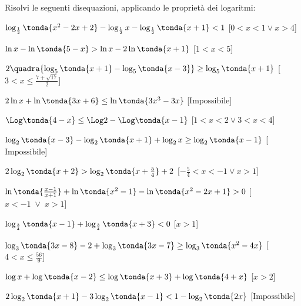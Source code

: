 \begin{esercizio}\label{ese:}
 Risolvi le seguenti disequazioni, applicando le proprietà dei logaritmi:
 \begin{enumeratea}
   \item \(\log_{\frac{1}{2}} \tonda{x^2-2x+2}-\log_{\frac{1}{2}} x- \log_{\frac{1}{2}} \tonda{x+1}<1\)
   \hfill [\(0<x<1 \lor x>4\)]
   \item \(\ln x-\ln \tonda{5-x}>\ln x-2\ln  \tonda{x+1}\)
   \hfill [\(1<x<5\)]
   \item \(2 \quadra{\log_5 \tonda{x+1}-\log_5 \tonda{x-3}}\geq\log_5 \tonda{x+1}\)
   \hfill [\(3<x\leq \frac{7+\sqrt{17}}{2}\)]
   \item \(2 \ln x+\ln \tonda{3x+6}\leq\ln \tonda{3x^3-3x}\)
   \hfill [\(\text{Impossibile}\)]
   \item \(\Log \tonda{4-x}\leq\Log 2 -\Log \tonda{x-1}\)
   \hfill [\(1<x<2 \lor 3<x<4\)]
   \item \(\log_2 \tonda{x-3} -\log_2 \tonda{x+1}+\log_2 x \geq \log_2 \tonda{x-1}\)
   \hfill [\(\text{Impossibile}\)]
   \item \(2 \log_2 \tonda{x+2}>\log_2 \tonda{x+\frac{5}{4}}+2\)
   \hfill [\(-\frac{5}{4}<x<-1 \lor x >1\)]
   \item \(\ln \tonda{\frac{x-1}{x+1}}+\ln \tonda{x^2-1}-\ln \tonda{x^2-2x+1}>0\)
   \hfill [\(x<-1 \;\lor\; x>1\)]
   \item \(\log_{\frac{3}{4}} \tonda{x-1}+\log_{\frac{3}{4}}\tonda{x+3}<0\)
   \hfill [\(x>1\)]
   \item \(\log_3 \tonda{3x-8}-2+\log_3 \tonda{3x-7}\geq\log_3 \tonda{x^2-4x}\)
   \hfill [\(4<x\leq\frac{56}{9}\)]
   \item  \(\log {x} +\log \tonda{x-2}\leq\log\tonda{x+3}+\log \tonda{4+x}\)
   \hfill [\(x>2\)]
   \item \(2\log_2 \tonda{x+1}-3\log_2 \tonda{x-1}<1-\log_2 \tonda{2x}\)
   \hfill [\(\text{Impossibile}\)]
 \end{enumeratea}
\end{esercizio}



